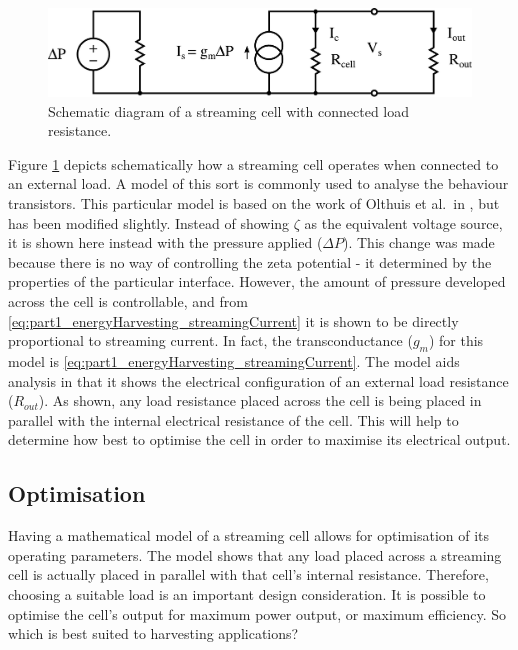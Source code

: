     \begin{figure}
        \centering
            \includegraphics[width=\textwidth]{content/pt1/01-PowerHarvesting/graphics/StreamingCell_EquivalentCircuit_output}
        \caption{\label{fig:StreamingCell_Schematic-representation}Schematic diagram of a streaming cell with connected load resistance.}
    \end{figure}
    Figure \ref{fig:StreamingCell_Schematic-representation} depicts schematically how a streaming cell operates when connected to an external load.
    A model of this sort is commonly used to analyse the behaviour transistors.
    This particular model is based on the work of Olthuis et al.\ in \cite{Olthuis2005}, but has been modified slightly.
    Instead of showing $\zeta$ as the equivalent voltage source, it is shown here instead with the pressure applied ($\Delta P$).
    This change was made because there is no way of controlling the zeta potential - it determined by the properties of the particular interface.
    However, the amount of pressure developed across the cell is controllable, and from \cref{eq:part1_energyHarvesting_streamingCurrent} it is shown to be directly proportional to streaming current.
    In fact, the transconductance ($g_{m}$) for this model is \cref{eq:part1_energyHarvesting_streamingCurrent}.
    The model aids analysis in that it shows the electrical configuration of an external load resistance ($R_{out}$).
    As shown, any load resistance placed across the cell is being placed in parallel with the internal electrical resistance of the cell.
    This will help to determine how best to optimise the cell in order to maximise its electrical output.


  \subsection{Optimisation}

    Having a mathematical model of a streaming cell allows for optimisation of its operating parameters.
    The model shows that any load placed across a streaming cell is actually placed in parallel with that cell's internal resistance.
    Therefore, choosing a suitable load is an important design consideration.
    It is possible to optimise the cell's output for maximum power output, or maximum efficiency.
    So which is best suited to harvesting applications?

